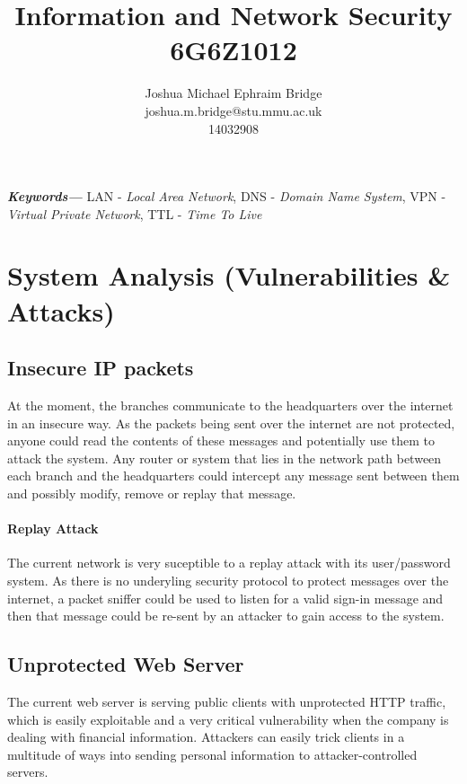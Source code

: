 \documentclass[11pt]{article}
\title{\vspace{2cm}\textbf{Information and Network Security}\\6G6Z1012}
\author{Joshua Michael Ephraim Bridge\\joshua.m.bridge@stu.mmu.ac.uk\\14032908}
\providecommand{\keywords}[1] {
  \small
  \textbf{\textit{Keywords---}} #1
}
\begin{document}
  \maketitle

  \vspace{1cm}

  \begin{abstract}

  \end{abstract}

  \vspace{0.5cm}

  \keywords{LAN - \textit{Local Area Network}, DNS - \textit{Domain Name System}, VPN - \textit{Virtual Private Network}, TTL - \textit{Time To Live}}

  \newpage


  \section{System Analysis (Vulnerabilities \& Attacks)}
    \subsection{Insecure IP packets}
      At the moment, the branches communicate to the headquarters over the internet in an insecure way. As the packets being sent over the internet are not protected, anyone could read the contents of these messages and potentially use them to attack the system. Any router or system that lies in the network path between each branch and the headquarters could intercept any message sent between them and possibly modify, remove or replay that message.

      \paragraph{Replay Attack}
        The current network is very suceptible to a replay attack with its user/password system. As there is no underyling security protocol to protect messages over the internet, a packet sniffer could be used to listen for a valid sign-in message and then that message could be re-sent by an attacker to gain access to the system.

    \subsection{Unprotected Web Server}
      The current web server is serving public clients with unprotected HTTP traffic, which is easily exploitable and a very critical vulnerability when the company is dealing with financial information. Attackers can easily trick clients in a multitude of ways into sending personal information to attacker-controlled servers.
\end{document}

